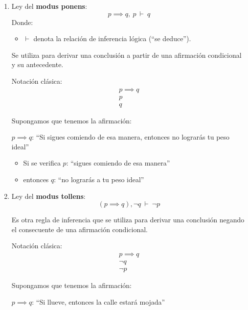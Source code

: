 \begin{enumerate}[label=\alph*)]
	\item Ley del \textbf{modus ponens}: \label{def:ponens} 
	\[ p \implies q, \ p \ \vdash \ q \]
	Donde:
	\begin{itemize}
		\item $\vdash$ denota la relación de inferencia lógica (``se deduce'').
	\end{itemize}
	
	Se utiliza para derivar una conclusión a partir de una afirmación condicional y su antecedente.
	
	Notación clásica:
	\[
	\begin{array}{l}
		p  \implies q\\
		p \\ \hline
		q
	\end{array}
	\]
	
	\begin{fmd-example}
		Supongamos que tenemos la afirmación:
		
		$p \implies q$: ``Si sigues comiendo de esa manera, entonces no lograrás tu peso ideal''
		
		\begin{itemize}			
			\item Si se verifica $p$: ``sigues comiendo de esa manera''
			\item entonces $q$: ``no lograrás a tu peso ideal''
		\end{itemize}
	\end{fmd-example}
	
	\item Ley del \textbf{modus tollens}: 
	\[ (p \implies q), \neg q \ \vdash \ \neg p \]
	
	Es otra regla de inferencia que se utiliza para derivar una conclusión negando el consecuente de una afirmación condicional.
	
	Notación clásica:
	\[
	\begin{array}{l}
		p  \implies q\\
		\neg q \\ \hline
		\neg p
	\end{array}
	\]
	
	\begin{fmd-example}
		Supongamos que tenemos la afirmación:
		
		\begin{center}
			$p \implies q$: ``Si llueve, entonces la calle estará mojada''
		\end{center}
		

\end{fmd-example}
\end{enumerate}
